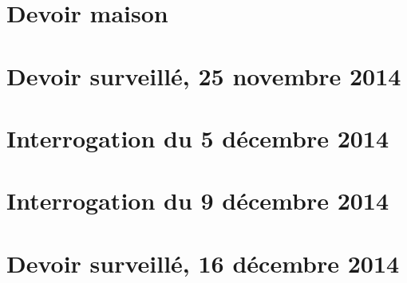 \section{Devoir maison}


\section{Devoir surveillé, 25 novembre 2014}


\section{Interrogation du 5 décembre 2014}


\section{Interrogation du 9 décembre 2014}


\section{Devoir surveillé, 16 décembre 2014}

